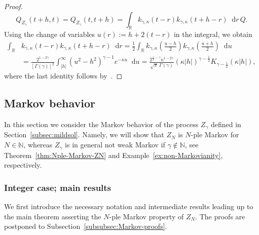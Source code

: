 \documentclass[reqno]{amsart}
\numberwithin{equation}{section}
\newcommand{\R}{\mathbb{R}}
\newcommand{\N}{\mathbb{N}}
\newcommand{\rd}{\mathop{}\!\mathrm{d}}
\theoremstyle{remark}
\theoremstyle{definition}
\begin{document}
\begin{proof}
	\begin{equation}
		Q_{Z_\gamma}(t + h, t)
		=
		Q_{Z_\gamma}(t, t + h) = \int_\R k_{\gamma, \kappa}(t-r) k_{\gamma,\kappa}(t + h-r) \rd r \, Q.
	\end{equation}
	Using the change of variables $u(r) := h + 2(t-r)$ in the integral, we obtain
	\begin{equation}
		\begin{aligned}
			\int_\R &k_{\gamma, \kappa}(t-r) k_{\gamma,\kappa}(t + h-r) \rd r
			=
			\frac{1}{2}
			\int_\R k_{\gamma, \kappa}(\tfrac{u-h}{2}) k_{\gamma,\kappa}(\tfrac{u+h}{2}) \rd u
			\\
			&=
			\frac{2^{1-2\gamma}}{[\Gamma(\gamma)]^2}
			\int_{|h|}^\infty (u^2-h^2)^{\gamma-1} e^{-\kappa u} \rd u
			=
			\frac{2^{\frac{1}{2}-\gamma}\kappa^{1-2\gamma}}
			{\sqrt{\pi}\,\Gamma(\gamma)}
			(\kappa |h|)^{\gamma-\frac{1}{2}} 
			K_{\gamma-\frac{1}{2}}(\kappa |h|),
		\end{aligned}
	\end{equation}
	where the last identity follows by~\cite[Part~I, Equation~(3.13)]{OberhettingerBadii1973}.
\end{proof}

\subsection{Markov behavior}
\label{subsec:fractional-int-diff:Markov}
In this section we consider the Markov behavior of the process $Z_\gamma$ defined in Section~\ref{subsec:mildsol}.
Namely, we will show that $Z_N$ is $N$-ple Markov for $N \in \N$, 
whereas $Z_\gamma$ is in general not weak Markov if $\gamma\not\in \N$, see Theorem~\ref{thm:Nple-Markov-ZN} and Example~\ref{ex:non-Markovianity}, respectively.

\subsubsection{Integer case; main results}
\label{subsubsec:Markov-results}
We first introduce the necessary notation 
and intermediate results leading up
to the main theorem asserting the $N$-ple Markov property of $Z_N$.
The proofs are postponed to Subsection~\ref{subsubsec:Markov-proofs}.
\end{document}
